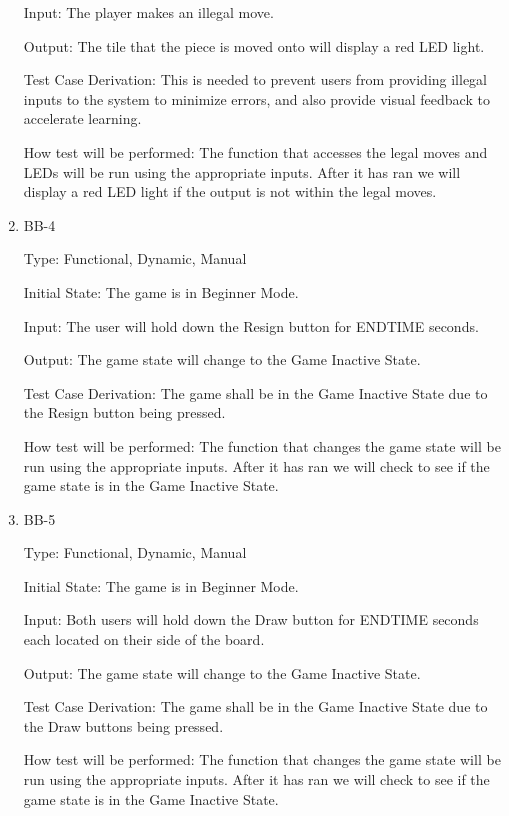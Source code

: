 \documentclass[12pt, titlepage]{article}
\begin{document}
\begin{enumerate}
    Input: The player makes an illegal move.
                        
    Output: The tile that the piece is moved onto will display a red LED
    light.
                        
    Test Case Derivation: This is needed to prevent users from providing illegal inputs to the system
    to minimize errors, and also provide visual feedback to accelerate learning.

    How test will be performed: The function that accesses the legal moves and LEDs will be run using the appropriate inputs.
    After it has ran we will display a red LED light if the output is not within the legal moves.  

    \item{BB-4\\}

    Type: Functional, Dynamic, Manual
                      
    Initial State: The game is in Beginner Mode.
                        
    Input: The user will hold down the Resign button for ENDTIME seconds.
                        
    Output: The game state will change to the Game Inactive State.
                        
    Test Case Derivation: The game shall be in the Game Inactive State due to the Resign button being pressed.
    
    How test will be performed: The function that changes the game state will be run using the appropriate inputs.
    After it has ran we will check to see if the game state is in the Game Inactive State.

    \item{BB-5\\}

    Type: Functional, Dynamic, Manual
                      
    Initial State: The game is in Beginner Mode.
                        
    Input: Both users will hold down the Draw button for ENDTIME seconds each located on their side of the board.
                        
    Output: The game state will change to the Game Inactive State.
                        
    Test Case Derivation: The game shall be in the Game Inactive State due to the Draw buttons being pressed.
    
    How test will be performed: The function that changes the game state will be run using the appropriate inputs.
    After it has ran we will check to see if the game state is in the Game Inactive State.


\end{enumerate}
\end{document}
